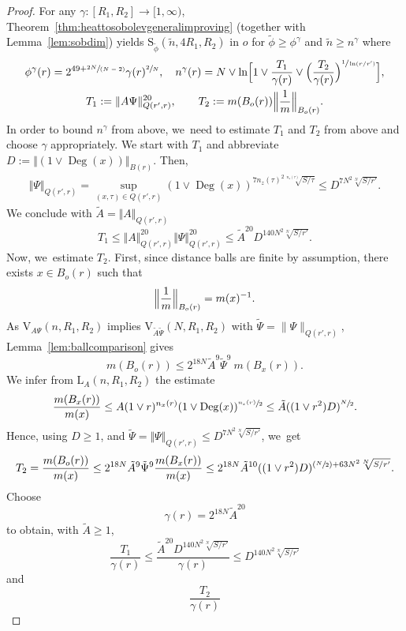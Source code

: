 \documentclass[JEP,XML,SOM,Unicode,published]{cedram}
\newcommand{\Psfrac}[2]{(\sfrac{#1}{#2})}
\newcommand{\spfrac}[2]{\sfrac{#1}{(#2)}}
\newcommand{\rS}{\mathrm{S}}
\newcommand{\rV}{\mathrm{V}}
\newcommand{\rL}{\mathrm{L}}
\theoremstyle{plain}
\theoremstyle{definition}
\DeclareMathOperator{\Deg}{Deg}
\begin{document}
\begin{proof}
For any $\gamma\colon[R_1,R_2]\to[1,\infty)$, Theorem~\ref{thm:heattosobolevgeneralimproving} (together with Lemma~\ref{lem:sobdim}) yields $\rS_{\tilde \phi}(\tilde n, 4R_1,R_2)$ in $o$ for $ \tilde \phi\ge \phi^{\gamma} $ and $ \tilde n\ge n^{\gamma} $ where
\begin{gather*}
\phi^{\gamma}(r)=2^{49+\spfrac{2 N}{N-2}}\gamma(r)^{\sfrac{2}{N}},
\quad
n^{\gamma}(r)= N\vee \ln\Bigl[1\vee
\frac{T_1}{\gamma(r)}\vee \Bigl(\frac{T_2}{\gamma(r)}\Bigr)^{\sfrac{1}{\ln(r/r')}}
\Bigr],
\\
T_1:={\Vert A\Psi\Vert_{Q(r',r)}^{20}},\qquad T_2:=m(B_o(r))\Bigl\|\frac1m\Bigr\|_{B_o(r)}.
\end{gather*}
In order to bound $n^{\gamma}$ from above, we~need to estimate $T_1$ and $T_2$ from above and choose $\gamma$ appropriately. We start with $T_1$ and abbreviate $
D :=\Vert (1\vee\Deg(x))\Vert_{B(r)}$. Then,
\begin{align*}
\Vert \Psi\Vert_{Q(r',r)}
=\sup_{(x,\tau)\in Q(r',r)} (1\vee\Deg(x))^{7n_z(\tau)^2\sqrt[n_z(\tau)]{S/\tau}}
\leq
D^{7 N^2\sqrt[ N]{S/r'}}.
\end{align*}
We conclude with $ \tilde A= \Vert A\Vert_{Q(r',r)}$
\[
T_1
\leq
\Vert A\Vert_{Q( r',r)}^{20}\Vert \Psi\Vert_{Q(r',r)}^{20}
\leq\tilde A^{20} D^{140 N^2\sqrt[ N]{S/r'}}.
\]
Now, we~estimate $T_2$. First, since distance balls are finite by assumption, there exists $x\in B_o(r)$ such that
\[
\Bigl\Vert \frac1m\Bigr\Vert_{B_o(r)}=m(x)^{-1}.
\]
{As $\rV_{\!A{\Psi}}(n,R_1,R_2)$ implies $\rV_{\!\tilde A{\tilde\Psi}}( N,R_1,R_2)$} with {$ \tilde \Psi=\|\Psi\|_{Q(r',r)} $}, Lemma~\ref{lem:ballcomparison} gives
\[
m(B_o(r))
\leq
2^{18 N}
\tilde A^9{\tilde\Psi^{9}}
\ m(B_{x}(r)).
\]
We infer from $\rL_{{A}}(n,R_1,R_2)$ the estimate
\[
\frac{m(B_{x}(r))}{m(x)}
\leq {A(1\vee r)^{n_x(r)}(1\vee\Deg(x))^{\sfrac{n_x(r)}{2}}}
\leq {\tilde A}{((1\vee r^2)
D)^{\sfrac{N}{2}}}.
\]
Hence, using $ D \geq 1$, and
{$\tilde \Psi=\Vert \Psi\Vert_{Q(r',r)}
\leq
D^{7 N^2\sqrt[ N]{S/r'}}$}, we~get
\begin{align*}
T_2
=\frac{m(B_{o}(r))}{m(x)}
\leq 2^{18 N}
\tilde A^9\tilde\Psi^9
\frac{m(B_{x}(r))}{m(x)}
\leq 2^{18 N}\tilde A^{10}
((1\vee r^2) D)^{\Psfrac{N}{2}+63 N^2\sqrt[ N]{S/r'}}.
\end{align*}
Choose
\[
\gamma(r)= {2^{18 N}\tilde A^{{20}}}
\]
to obtain, with $ \tilde A\ge 1 $,
\[
\frac{T_1}{\gamma(r)}
\leq
\frac{\tilde A^{20} D^{140 N^2\sqrt[ N]{S/r'}}}{\gamma(r)}
\leq D^{140 N^2\sqrt[ N]{S/r'}}
\]
and
\[
\frac{T_2}{\gamma(r)}
\]
\end{proof}
\end{document}
